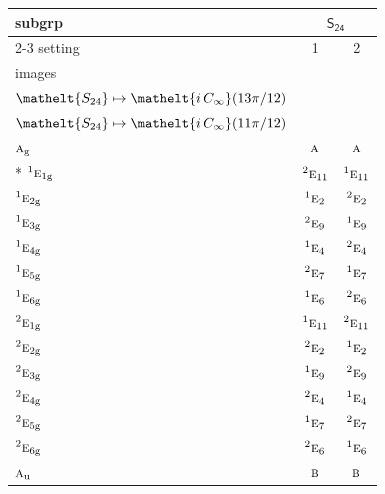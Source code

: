 \documentclass[10pt,a4paper]{article}
\numberwithin{equation}{section}
\newcommand{\eltfont}[1]{{\let\sigma\eltsigma\mathelt{#1}}}
\newcommand{\grp}[1]{\mathsf{#1}}
\newcommand{\irr}[1]{\text{\normalfont\scshape #1}}
\newcommand{\conjpair}[1]{{}^{#1}}
\newcommand{\cls}[1]{\eltfont{#1}}
\newcommand{\elt}[1]{\eltfont{#1}}
\newcommand{\ptag}[1]{\mathrm{#1}}
\begin{document}
{\small\begin{longtable}{@{}lcc@{}}\toprule
subgrp & \multicolumn{2}{c}{\href{S24.pdf}{$\grp{S_{24}}$}}\\\cmidrule(lr){2-3}
setting & 1 & 2\\
images & {\scriptsize\begin{tabular}[t]{@{}c@{}}$\cls{C_{12}} \mapsto \elt{C_{\infty}}(\pi/6)$\\$\cls{S_{24}} \mapsto \elt{i\,C_{\infty}}(13\pi/12)$\end{tabular}} & {\scriptsize\begin{tabular}[t]{@{}c@{}}$\cls{C_{12}} \mapsto \elt{C_{\infty}}(11\pi/6)$\\$\cls{S_{24}} \mapsto \elt{i\,C_{\infty}}(11\pi/12)$\end{tabular}}\\\midrule\endhead
\bottomrule\endfoot\endlastfoot
$\irr{a}_{\ptag{g}}$ & $\irr{a}$ & $\irr{a}$\\*
$\conjpair{1}\irr{e}_{1\ptag{g}}$ & $\conjpair{2}\irr{e}_{11}$ & $\conjpair{1}\irr{e}_{11}$\\
$\conjpair{1}\irr{e}_{2\ptag{g}}$ & $\conjpair{1}\irr{e}_{2}$ & $\conjpair{2}\irr{e}_{2}$\\
$\conjpair{1}\irr{e}_{3\ptag{g}}$ & $\conjpair{2}\irr{e}_{9}$ & $\conjpair{1}\irr{e}_{9}$\\
$\conjpair{1}\irr{e}_{4\ptag{g}}$ & $\conjpair{1}\irr{e}_{4}$ & $\conjpair{2}\irr{e}_{4}$\\
$\conjpair{1}\irr{e}_{5\ptag{g}}$ & $\conjpair{2}\irr{e}_{7}$ & $\conjpair{1}\irr{e}_{7}$\\
$\conjpair{1}\irr{e}_{6\ptag{g}}$ & $\conjpair{1}\irr{e}_{6}$ & $\conjpair{2}\irr{e}_{6}$\\
$\conjpair{2}\irr{e}_{1\ptag{g}}$ & $\conjpair{1}\irr{e}_{11}$ & $\conjpair{2}\irr{e}_{11}$\\
$\conjpair{2}\irr{e}_{2\ptag{g}}$ & $\conjpair{2}\irr{e}_{2}$ & $\conjpair{1}\irr{e}_{2}$\\
$\conjpair{2}\irr{e}_{3\ptag{g}}$ & $\conjpair{1}\irr{e}_{9}$ & $\conjpair{2}\irr{e}_{9}$\\
$\conjpair{2}\irr{e}_{4\ptag{g}}$ & $\conjpair{2}\irr{e}_{4}$ & $\conjpair{1}\irr{e}_{4}$\\
$\conjpair{2}\irr{e}_{5\ptag{g}}$ & $\conjpair{1}\irr{e}_{7}$ & $\conjpair{2}\irr{e}_{7}$\\
$\conjpair{2}\irr{e}_{6\ptag{g}}$ & $\conjpair{2}\irr{e}_{6}$ & $\conjpair{1}\irr{e}_{6}$\\
$\irr{a}_{\ptag{u}}$ & $\irr{b}$ & $\irr{b}$\\

\end{longtable}}
\end{document}
